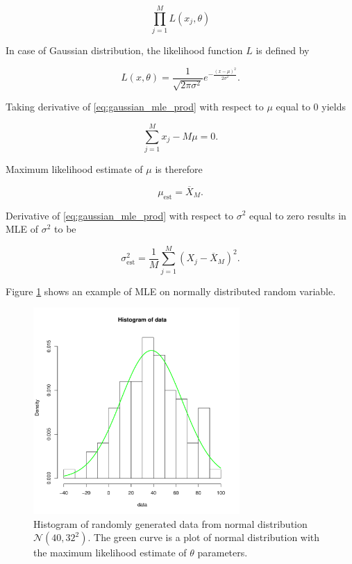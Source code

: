 \documentclass[thesis=B,english]{FITthesis}[2012/06/26]
\begin{document}
\begin{equation} \label{eq:gaussian_mle_prod}
\prod_{j=1}^{M} L(x_j, \theta)
\end{equation}

In case of Gaussian distribution, the likelihood function $L$ is defined by

\begin{equation}
L(x, \theta) = \frac{1}{\sqrt{2 \pi \sigma^2}}e^{-\frac{(x-\mu)^2}{2 \sigma^2}}.
\end{equation}

Taking derivative of \ref{eq:gaussian_mle_prod} with respect to $\mu$ equal to 0 yields

\begin{equation}
\sum_{j=1}^{M}{x_j - M \mu} = 0.
\end{equation}

Maximum likelihood estimate of $\mu$ is therefore

\begin{equation}
\mu_{\text{est}} = \overline X_M.
\end{equation}

Derivative of \ref{eq:gaussian_mle_prod} with respect to $\sigma^2$ equal to zero results in MLE of $\sigma^2$ to be

\begin{equation}
\sigma^2_{\text{est}} = \frac{1}{M} \sum_{j=1}^{M} {(X_j-\overline X_M)^2}.
\end{equation}

Figure \ref{fig:normal_mle} shows an example of MLE on normally distributed random variable.

\begin{figure}
	\centering
 	\includegraphics[width=0.7\textwidth]{normal_mle}
 	\caption{Histogram of randomly generated data from normal distribution $\mathcal{N}(40,32^2)$. The green curve is a plot of normal distribution with the maximum likelihood estimate of $\theta$ parameters.}
 	\label{fig:normal_mle}
\end{figure}
\end{document}
